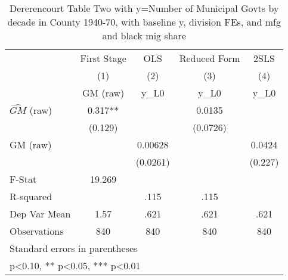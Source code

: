 \begin{table}[htbp]\centering
\def\sym#1{\ifmmode^{#1}\else\(^{#1}\)\fi}
\caption{Dererencourt Table Two with y=Number of Municipal Govts by decade in County 1940-70, with baseline y, division FEs, and mfg and black mig share}
\begin{tabular}{l*{4}{c}}
\toprule
                    & First Stage   &         OLS   &Reduced Form   &        2SLS   \\
                    &\multicolumn{1}{c}{(1)}&\multicolumn{1}{c}{(2)}&\multicolumn{1}{c}{(3)}&\multicolumn{1}{c}{(4)}\\
                    &\multicolumn{1}{c}{GM  (raw)}&\multicolumn{1}{c}{y\_L0}&\multicolumn{1}{c}{y\_L0}&\multicolumn{1}{c}{y\_L0}\\
\midrule
$\hat{GM}$ (raw)    &       0.317** &               &      0.0135   &               \\
                    &     (0.129)   &               &    (0.0726)   &               \\
\addlinespace
GM  (raw)           &               &     0.00628   &               &      0.0424   \\
                    &               &    (0.0261)   &               &     (0.227)   \\
\midrule
F-Stat              &      19.269   &               &               &               \\
R-squared           &               &        .115   &        .115   &               \\
Dep Var Mean        &        1.57   &        .621   &        .621   &        .621   \\
Observations        &         840   &         840   &         840   &         840   \\
\bottomrule
\multicolumn{5}{l}{\footnotesize Standard errors in parentheses}\\
\multicolumn{5}{l}{\footnotesize * p<0.10, ** p<0.05, *** p<0.01}\\
\end{tabular}
\end{table}
